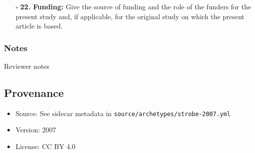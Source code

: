 \documentclass[11pt]{article}
\def\tightlist{}
\begin{document}
\begin{Form}
\begin{itemize}
\tightlist
\item[$\square$]
  \textbf{22. Funding:} Give the source of funding and the role of the
  funders for the present study and, if applicable, for the original
  study on which the present article is based.
\end{itemize}

\subsubsection{Notes}\label{notes}

{Reviewer notes}

\subsection{Provenance}\label{provenance}

\begin{itemize}
\tightlist
\item
  Source: See sidecar metadata in
  \texttt{source/archetypes/strobe-2007.yml}
\item
  Version: 2007
\item
  License: CC BY 4.0
\end{itemize}

\end{Form}
\end{document}
